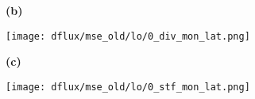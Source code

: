 \documentclass[preview]{standalone}
\begin{document}
\begin{figure}
  \begin{subfigure}[t]{0.05\textwidth}
    \textbf{\large{(b)}}
  \end{subfigure}
  \begin{subfigure}[t]{0.95\textwidth}
    \texttt{[image: dflux/mse\_old/lo/0\_div\_mon\_lat.png]}
  \end{subfigure}

  \begin{subfigure}[t]{0.05\textwidth}
    \textbf{\large{(c)}}
  \end{subfigure}
  \begin{subfigure}[t]{0.95\textwidth}
    \texttt{[image: dflux/mse\_old/lo/0\_stf\_mon\_lat.png]}
  \end{subfigure}

\end{figure}
\end{document}

